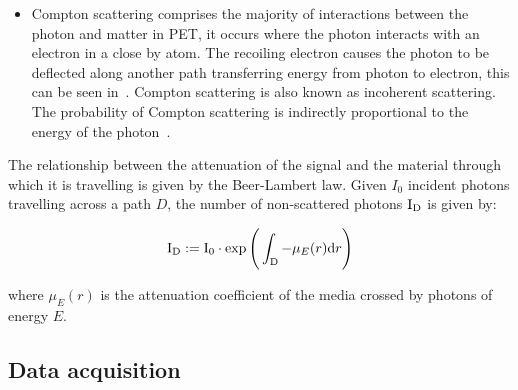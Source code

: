 \begin{itemize}
                    \item Compton scattering comprises the majority of interactions between the photon and matter in \gls{PET}, it occurs where the photon interacts with an electron in a close by atom. The recoiling electron causes the photon to be deflected along another path transferring energy from photon to electron, this can be seen in~. Compton scattering is also known as incoherent scattering. The probability of Compton scattering is indirectly proportional to the energy of the photon~.
                \end{itemize}
                
                The relationship between the attenuation of the signal and the material through which it is travelling is given by the Beer-Lambert law. Given $I_0$ incident photons travelling across a path $D$, the number of non-scattered photons $\mathrm{I}_{\mathrm{D}}$ is given by: %
                 
                \begin{equation} \label{sec:eq:beer_lambert_law}
                    \rmI_{\rmD} := \rmI_{0} \cdot \exp\Bigg(\int_{\rmD} - \mu_E(r)\rmd r \Bigg) %
                \end{equation}

                \noindent where $\mu_E(r)$ is the attenuation coefficient of the media crossed by photons of energy $E$.
        
        \subsection{Data acquisition} \label{sec:data_acquisition}
            
